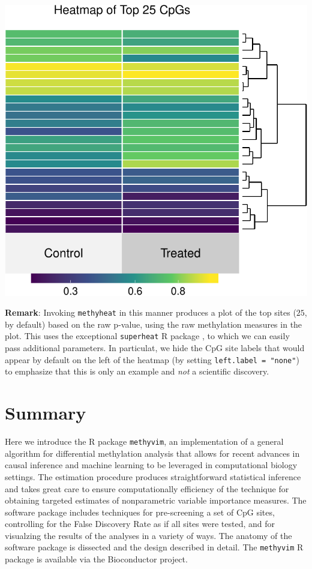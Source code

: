 \documentclass[9pt,a4paper,]{extarticle}
\theoremstyle{definition}
\theoremstyle{definition}
\theoremstyle{definition}
\theoremstyle{remark}
\begin{document}
\begin{center}\includegraphics{paper_BiocF1000_files/figure-latex/methyvim-heatmap-1} \end{center}

\textbf{Remark}: Invoking \texttt{methyheat} in this manner produces a plot of the top sites
(\(25\), by default) based on the raw p-value, using the raw methylation measures
in the plot. This uses the exceptional \texttt{superheat} R package
\citep{barter2017superheat}, to which we can easily pass additional parameters. In
particulat, we hide the CpG site labels that would appear by default on the left
of the heatmap (by setting \texttt{left.label\ =\ "none"}) to emphasize that this is only
an example and \emph{not} a scientific discovery.

\hypertarget{summary}{%
\section{Summary}\label{summary}}

Here we introduce the R package \texttt{methyvim}, an implementation of a general
algorithm for differential methylation analysis that allows for recent advances
in causal inference and machine learning to be leveraged in computational
biology settings. The estimation procedure produces straightforward statistical
inference and takes great care to ensure computationally efficiency of the
technique for obtaining targeted estimates of nonparametric variable importance
measures. The software package includes techniques for pre-screening a set of
CpG sites, controlling for the False Discovery Rate as if all sites were tested,
and for visualzing the results of the analyses in a variety of ways. The anatomy
of the software package is dissected and the design described in detail. The
\texttt{methyvim} R package is available via the Bioconductor project.
\end{document}

